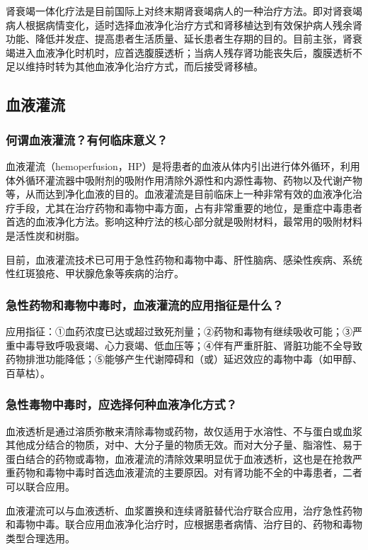 肾衰竭一体化疗法是目前国际上对终末期肾衰竭病人的一种治疗方法。即对肾衰竭病人根据病情变化，适时选择血液净化治疗方式和肾移植达到有效保护病人残余肾功能、降低并发症、提高患者生活质量、延长患者生存期的目的。目前主张，肾衰竭进入血液净化时机时，应首选腹膜透析；当病人残存肾功能丧失后，腹膜透析不足以维持时转为其他血液净化治疗方式，而后接受肾移植。

\subsection{血液灌流}

\subsubsection{何谓血液灌流？有何临床意义？}

血液灌流（hemoperfusion，HP）是将患者的血液从体内引出进行体外循环，利用体外循环灌流器中吸附剂的吸附作用清除外源性和内源性毒物、药物以及代谢产物等，从而达到净化血液的目的。血液灌流是目前临床上一种非常有效的血液净化治疗手段，尤其在治疗药物和毒物中毒方面，占有非常重要的地位，是重症中毒患者首选的血液净化方法。影响这种疗法的核心部分就是吸附材料，最常用的吸附材料是活性炭和树脂。

目前，血液灌流技术已可用于急性药物和毒物中毒、肝性脑病、感染性疾病、系统性红斑狼疮、甲状腺危象等疾病的治疗。

\subsubsection{急性药物和毒物中毒时，血液灌流的应用指征是什么？}

应用指征：①血药浓度已达或超过致死剂量；②药物和毒物有继续吸收可能；③严重中毒导致呼吸衰竭、心力衰竭、低血压等；④伴有严重肝脏、肾脏功能不全导致药物排泄功能降低；⑤能够产生代谢障碍和（或）延迟效应的毒物中毒（如甲醇、百草枯）。

\subsubsection{急性毒物中毒时，应选择何种血液净化方式？}

血液透析是通过溶质弥散来清除毒物或药物，故仅适用于水溶性、不与蛋白或血浆其他成分结合的物质，对中、大分子量的物质无效。而对大分子量、脂溶性、易于蛋白结合的药物或毒物，血液灌流的清除效果明显优于血液透析，这也是在抢救严重药物和毒物中毒时首选血液灌流的主要原因。对有肾功能不全的中毒患者，二者可以联合应用。

血液灌流可以与血液透析、血浆置换和连续肾脏替代治疗联合应用，治疗急性药物和毒物中毒。联合应用血液净化治疗时，应根据患者病情、治疗目的、药物和毒物类型合理选用。

